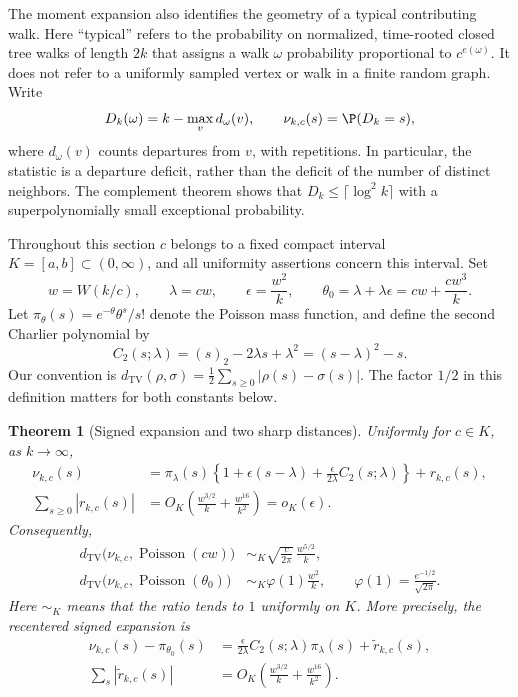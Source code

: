 \documentclass[11pt,letterpaper]{article}
\newtheorem{theorem}{Theorem}[section]
\theoremstyle{remark}\newtheorem{remark}[theorem]{Remark}
\newcommand{\Poi}{\operatorname{Poisson}}\newcommand{\Bin}{\operatorname{Bin}}
\newcommand{\fall}[2]{(#1)_{#2}}\newcommand{\rise}[2]{#1^{\overline{#2}}}
\theoremstyle{definition}\newtheorem{definition}[theorem]{Definition}
\newcommand{\TV}{d_{\mathrm{TV}}}
\begin{document}
The moment expansion also identifies the geometry of a typical contributing
walk.  Here ``typical'' refers to the probability on normalized, time-rooted
closed tree walks of length $2k$ that assigns a walk $\omega$ probability
proportional to $c^{e(\omega)}$.  It does not refer to a uniformly sampled
vertex or walk in a finite random graph.  Write
\[
 D_k(\omega)=k-\max_v d_\omega(v),\qquad
 \nu_{k,c}(s)=\P(D_k=s),
\]
where $d_\omega(v)$ counts departures from $v$, with repetitions.
In particular, the statistic is a departure deficit, rather than the
deficit of the number of distinct neighbors.  The complement theorem
shows that $D_k\le\lceil\log^2 k\rceil$ with a superpolynomially small
exceptional probability.

Throughout this section $c$ belongs to a fixed compact interval
$K=[a,b]\subset(0,\infty)$, and all uniformity assertions concern this
interval.  Set
\begin{equation}\label{sgm:md:dl:parameters}
 w=W(k/c),\qquad \lambda=cw,\qquad
 \epsilon=\frac{w^2}{k},\qquad
 \theta_0=\lambda+\lambda\epsilon
          =cw+\frac{cw^3}{k}.
\end{equation}
Let $\pi_\theta(s)=e^{-\theta}\theta^s/s!$ denote the Poisson mass
function, and define the second Charlier polynomial by
\begin{equation}\label{sgm:md:dl:charlier}
 C_2(s;\lambda)=\fall{s}{2}-2\lambda s+\lambda^2
               =(s-\lambda)^2-s.
\end{equation}
Our convention is
$\TV(\rho,\sigma)=\tfrac12\sum_{s\ge0}|\rho(s)-\sigma(s)|$.
The factor $1/2$ in this definition matters for both constants below.

\begin{theorem}[Signed expansion and two sharp distances]
\label{sgm:md:dl:main}
Uniformly for $c\in K$, as $k\to\infty$,
\begin{align}
 \nu_{k,c}(s)
 &=\pi_\lambda(s)\left\{
      1+\epsilon(s-\lambda)
        +\frac{\epsilon}{2\lambda}C_2(s;\lambda)\right\}
       +r_{k,c}(s),\label{sgm:md:dl:signed}\\
 \sum_{s\ge0}|r_{k,c}(s)|
 &=O_K\!\left(\frac{w^{3/2}}k+
                    \frac{w^{16}}{k^2}\right)
   =o_K(\epsilon).\label{sgm:md:dl:signed-error}
\end{align}
Consequently,
\begin{align}
 \TV\bigl(\nu_{k,c},\Poi(cw)\bigr)
 &\sim_K\sqrt{\frac{c}{2\pi}}\,
                   \frac{w^{5/2}}k,\label{sgm:md:dl:uncentered-tv}\\
 \TV\bigl(\nu_{k,c},\Poi(\theta_0)\bigr)
 &\sim_K\varphi(1)\frac{w^2}k,
 \qquad \varphi(1)=\frac{e^{-1/2}}{\sqrt{2\pi}}.
 \label{sgm:md:dl:recentered-tv}
\end{align}
Here $\sim_K$ means that the ratio tends to $1$ uniformly on $K$.
More precisely, the recentered signed expansion is
\begin{align}
 \nu_{k,c}(s)-\pi_{\theta_0}(s)
 &=\frac{\epsilon}{2\lambda}C_2(s;\lambda)\pi_\lambda(s)
       +\widetilde r_{k,c}(s),\label{sgm:md:dl:recentered-signed}\\
 \sum_s|\widetilde r_{k,c}(s)|
 &=O_K\!\left(\frac{w^{3/2}}k+\frac{w^{16}}{k^2}\right).
\end{align}
\end{theorem}
\end{document}
